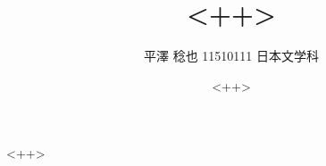 \documentclass[a4j]{jarticle}
\title{<++>}
\author{平澤 稔也 11510111 日本文学科}
\date{<++>}
\begin{document}
\maketitle
<++>
\end{document}

